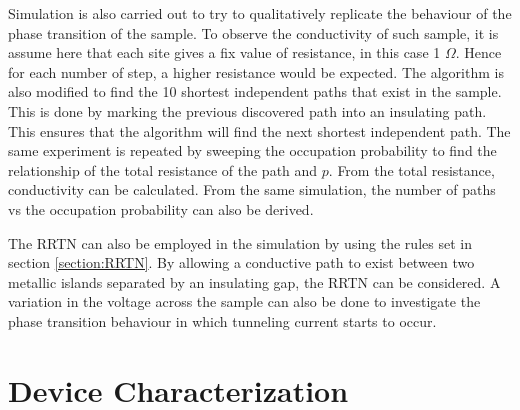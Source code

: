 \documentclass[11pt,a4paper]{report}
\begin{document}
Simulation is also carried out to try to qualitatively replicate the behaviour of the phase transition of the sample. To observe the conductivity of such sample, it is assume here that each site gives a fix value of resistance, in this case 1 $\Omega$. Hence for each number of step, a higher resistance would be expected. The algorithm is also modified to find the 10 shortest independent paths that exist in the sample. This is done by marking the previous discovered path into an insulating path. This ensures that the algorithm will find the next shortest independent path. The same experiment is repeated by sweeping the occupation probability to find the relationship of the total resistance of the path and $p$. From the total resistance, conductivity can be calculated. From the same simulation, the number of paths vs the occupation probability can also be derived.

The RRTN can also be employed in the simulation by using the rules set in section \ref{section:RRTN}. By allowing a conductive path to exist between two metallic islands separated by an insulating gap, the RRTN can be considered. A variation in the voltage across the sample can also be done to investigate the phase transition behaviour in which tunneling current starts to occur.

\section{Device Characterization}
\end{document}
